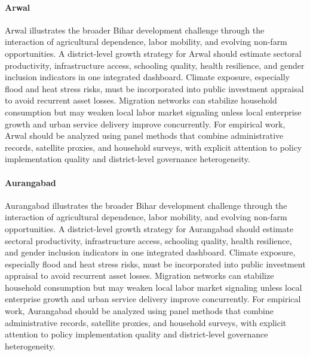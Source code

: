 \documentclass[preprint,12pt]{elsarticle}
\begin{document}
\paragraph{Arwal} Arwal illustrates the broader Bihar development challenge through the interaction of agricultural dependence, labor mobility, and evolving non-farm opportunities. A district-level growth strategy for Arwal should estimate sectoral productivity, infrastructure access, schooling quality, health resilience, and gender inclusion indicators in one integrated dashboard. Climate exposure, especially flood and heat stress risks, must be incorporated into public investment appraisal to avoid recurrent asset losses. Migration networks can stabilize household consumption but may weaken local labor market signaling unless local enterprise growth and urban service delivery improve concurrently. For empirical work, Arwal should be analyzed using panel methods that combine administrative records, satellite proxies, and household surveys, with explicit attention to policy implementation quality and district-level governance heterogeneity.

\paragraph{Aurangabad} Aurangabad illustrates the broader Bihar development challenge through the interaction of agricultural dependence, labor mobility, and evolving non-farm opportunities. A district-level growth strategy for Aurangabad should estimate sectoral productivity, infrastructure access, schooling quality, health resilience, and gender inclusion indicators in one integrated dashboard. Climate exposure, especially flood and heat stress risks, must be incorporated into public investment appraisal to avoid recurrent asset losses. Migration networks can stabilize household consumption but may weaken local labor market signaling unless local enterprise growth and urban service delivery improve concurrently. For empirical work, Aurangabad should be analyzed using panel methods that combine administrative records, satellite proxies, and household surveys, with explicit attention to policy implementation quality and district-level governance heterogeneity.
\end{document}
